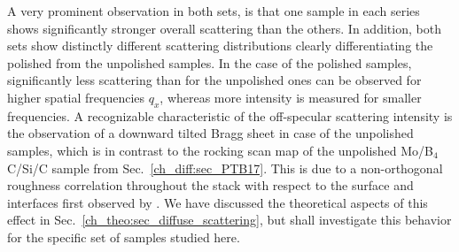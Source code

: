 A very prominent observation in both sets, is that one sample in each series shows significantly stronger overall scattering than the others. In addition, both sets show distinctly different scattering distributions clearly differentiating the polished from the unpolished samples. In the case of the polished samples, significantly less scattering than for the unpolished ones can be observed for higher spatial frequencies $q_x$, whereas more intensity is measured for smaller frequencies. A recognizable characteristic of the off-specular scattering intensity is the observation of a downward tilted Bragg sheet in case of the unpolished samples, which is in contrast to the rocking scan map of the unpolished Mo/B$_4$C/Si/C sample from Sec.~\ref{ch_diff:sec_PTB17}. This is due to a non-orthogonal roughness correlation throughout the stack with respect to the surface and interfaces first observed by \textcite{gullikson_asymmetric_1999}. We have discussed the theoretical aspects of this effect in Sec.~\ref{ch_theo:sec_diffuse_scattering}, but shall investigate this behavior for the specific set of samples studied here.

